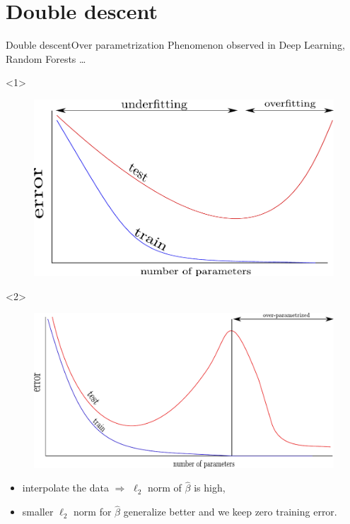 \documentclass[10pt,aspectratio=43]{beamer}
\begin{document}
\section{Double descent}
\begin{frame}{Double descent}{Over parametrization}
    Phenomenon observed in Deep Learning, Random Forests \dots
    \begin{onlyenv}<1>
        \begin{figure}
            \centering
            \includegraphics[scale=.6]{under_overfit_curves.pdf}
        \end{figure}
    \end{onlyenv}
    \begin{onlyenv}<2>
        \begin{figure}
            \centering
            \includegraphics[scale=.6]{scheme_doubledescent.pdf}
        \end{figure}
    \begin{itemize}
        \item interpolate the data $\Longrightarrow$ $\ell_2$ norm of $\hat\beta$ is high,
        \item smaller $\ell_2$ norm for $\hat\beta$ generalize better and we keep zero training error.
    \end{itemize}
    \end{onlyenv}
\end{frame}
\end{document}
